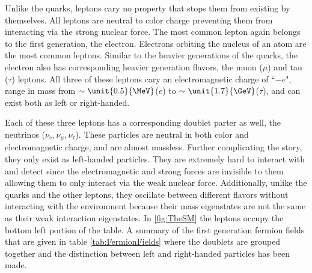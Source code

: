Unlike the quarks, leptons cary no property that stops them from existing by themselves. All leptons are neutral to color charge preventing them from interacting via the strong nuclear force. The most common lepton again belongs to the first generation, the electron. Electrons orbiting the nucleus of an atom are the most common leptons. Similar to the heavier generations of the quarks, the electron also has corresponding heavier generation flavors, the muon ($\mu$) and tau ($\tau$) leptons. All three of these leptons cary an electromagnetic charge of ``$-e$", range in mass from $\sim\unit{0.5}{\MeV}$($e$) to $\sim\unit{1.7}{\GeV}$($\tau$), and can exist both as left or right-handed.

Each of these three leptons has a corresponding doublet parter as well, the neutrinos ($\nu_{e}, \nu_{\mu}, \nu_{\tau}$). These particles are neutral in both color and electromagnetic charge, and are almost massless. Further complicating the story, they only exist as left-handed particles. They are extremely hard to interact with and detect since the electromagnetic and strong forces are invisible to them allowing them to only interact via the weak nuclear force. Additionally, unlike the quarks and the other leptons, they oscillate between different flavors without interacting with the environment because their mass eigenstates are not the same as their weak interaction eigenstates. In \ref{fig:TheSM} the leptons occupy the bottom left portion of the table. A summary of the first generation fermion fields that are given in table \ref{tab:FermionFields} where the doublets are grouped together and the distinction between left and right-handed particles has been made.

